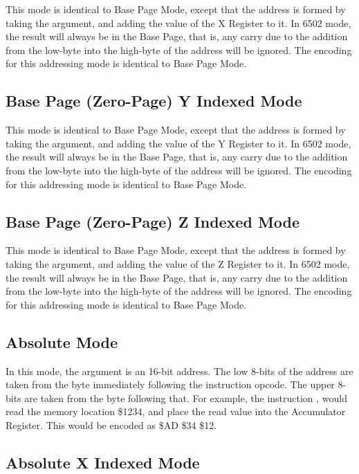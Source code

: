 This mode is identical to Base Page Mode, except that the address is formed by taking the
argument, and adding the value of the X Register to it.  In 6502 mode, the result will always
be in the Base Page, that is, any carry due to the addition from the low-byte into the high-byte
of the address will be ignored.  The encoding for this addressing mode is identical to Base Page
Mode.

\subsection{Base Page (Zero-Page) Y Indexed Mode}

This mode is identical to Base Page Mode, except that the address is formed by taking the
argument, and adding the value of the Y Register to it.  In 6502 mode, the result will always
be in the Base Page, that is, any carry due to the addition from the low-byte into the high-byte
of the address will be ignored.  The encoding for this addressing mode is identical to Base Page
Mode.

\subsection{Base Page (Zero-Page) Z Indexed Mode}

This mode is identical to Base Page Mode, except that the address is formed by taking the
argument, and adding the value of the Z Register to it.  In 6502 mode, the result will always
be in the Base Page, that is, any carry due to the addition from the low-byte into the high-byte
of the address will be ignored.  The encoding for this addressing mode is identical to Base Page
Mode.

\subsection{Absolute Mode}

In this mode, the argument is an 16-bit address.  The low 8-bits of the address are taken from
the byte immediately following the instruction opcode. The upper 8-bits are taken from the
byte following that.  For example, the instruction , would read the
memory location \$1234, and place the read value into the Accumulator Register.  This would
be encoded as \$AD \$34 \$12.

\subsection{Absolute X Indexed Mode}

